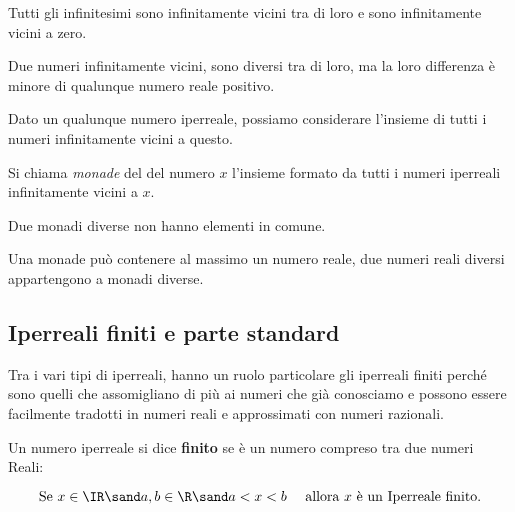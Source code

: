 Tutti gli infinitesimi sono infinitamente vicini tra di loro e sono 
infinitamente vicini a zero.

Due numeri infinitamente vicini, sono diversi tra di loro, ma la loro 
differenza è minore di qualunque numero reale positivo.

Dato un qualunque numero iperreale, possiamo considerare l'insieme di tutti 
i numeri infinitamente vicini a questo. 

\begin{definizione}
 Si chiama \emph{monade} del del numero \(x\) l'insieme formato da tutti i 
numeri iperreali infinitamente vicini a \(x\).
\end{definizione}

Due monadi diverse non hanno elementi in comune.

Una monade può contenere al massimo un numero reale, due numeri reali 
diversi appartengono a monadi diverse.

\subsection{Iperreali finiti e parte standard}
\label{subsec:insnum_partestandard}

Tra i vari tipi di iperreali, hanno un ruolo particolare gli iperreali 
finiti perché sono quelli che assomigliano di più ai numeri che già 
conosciamo e possono essere facilmente tradotti in numeri reali e 
approssimati con numeri razionali. 

\begin{definizione}
 Un numero iperreale si dice \textbf{finito} se è un numero compreso tra 
due numeri Reali:

\[\text{Se } x \in \IR \sand a, b \in \R \sand 
  a < x < b \quad \text{ allora } x \text{ è un Iperreale finito.}\]
\end{definizione}

